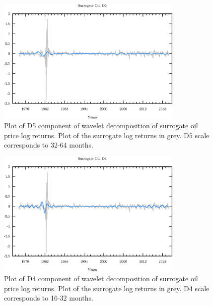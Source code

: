 \begin{figure}
\begin{center}
\includegraphics[width=0.8\textwidth]{./code/plot/surrogate_oil_wr_D5.eps}
\caption{Plot of D5 component of wavelet decomposition of surrogate oil price log returns. 
	Plot of the surrogate log returns in grey. D5 scale corresponds to 32-64 months.}
\end{center}
\label{fig:s-oil-wr-d5}
\end{figure}

\begin{figure}
\begin{center}
\includegraphics[width=0.8\textwidth]{./code/plot/surrogate_oil_wr_D4.eps}
\caption{Plot of D4 component of wavelet decomposition of surrogate oil price log returns. 
	Plot of the surrogate log returns in grey. D4 scale corresponds to 16-32 months.}
\end{center}
\label{fig:s-oil-wr-d4}
\end{figure}

